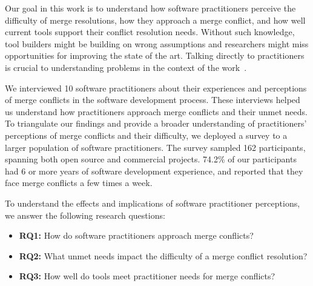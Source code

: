 Our goal in this work is to understand how software practitioners perceive the difficulty of merge resolutions, how they approach a merge conflict, and how well current tools support their conflict resolution needs. Without such knowledge, tool builders might be building on wrong assumptions and researchers might miss opportunities for improving the state of the art.
Talking directly to practitioners is crucial to understanding problems in the context of the work~\cite{fritz2010using, sillito2006questions, de2008answering, ko2007information}.

We interviewed 10 software practitioners about their experiences and perceptions of merge conflicts in the software development process. These interviews helped us understand how practitioners approach merge conflicts and their unmet needs.
To triangulate our findings and provide a broader understanding of practitioners' perceptions of merge conflicts and their difficulty, we deployed a survey to a larger population of software practitioners.
The survey sampled 162 participants, spanning both open source and commercial projects. 74.2\% of our participants had 6 or more years of software development experience, and reported that they face merge conflicts a few times a week.

To understand the effects and implications of software practitioner perceptions, we answer the following research questions:

\begin{itemize}
\item \textbf{RQ1:} How do software practitioners approach merge conflicts?
\item \textbf{RQ2:} What unmet needs impact the difficulty of a merge conflict resolution?
\item \textbf{RQ3:} How well do tools meet practitioner needs for merge conflicts?
\end{itemize}

